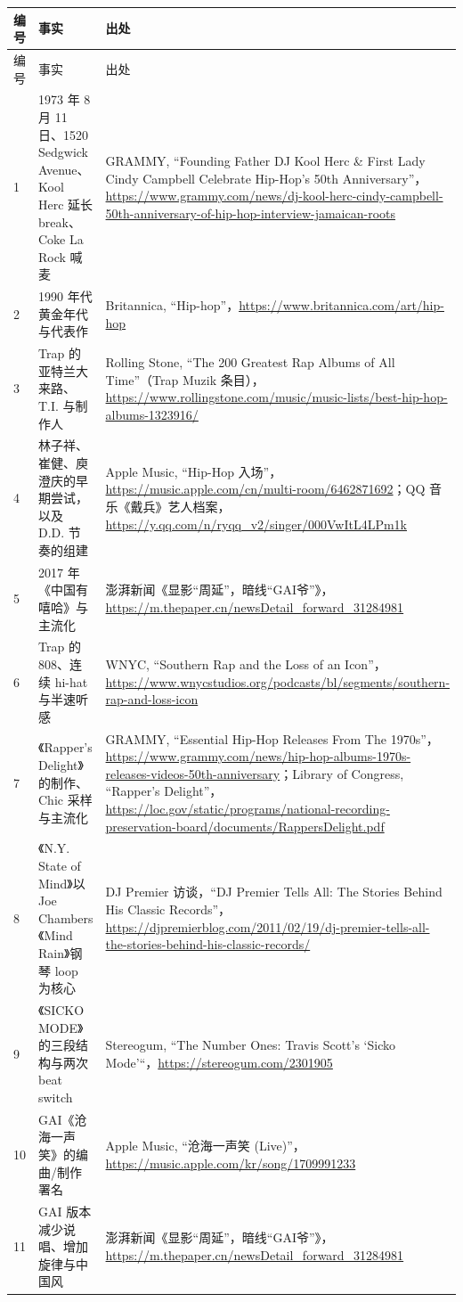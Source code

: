 \begin{longtable}{p{}p{}p{}}
\toprule
编号 & 事实 & 出处 \\
\midrule
\endfirsthead
\toprule
编号 & 事实 & 出处 \\
\midrule
\endhead
1 & 1973 年 8 月 11 日、1520 Sedgwick Avenue、Kool Herc 延长 break、Coke La Rock 喊麦 & GRAMMY, ``Founding Father DJ Kool Herc \& First Lady Cindy Campbell Celebrate Hip-Hop's 50th Anniversary''，\url{https://www.grammy.com/news/dj-kool-herc-cindy-campbell-50th-anniversary-of-hip-hop-interview-jamaican-roots} \\
2 & 1990 年代黄金年代与代表作 & Britannica, ``Hip-hop''，\url{https://www.britannica.com/art/hip-hop} \\
3 & Trap 的亚特兰大来路、T.I. 与制作人 & Rolling Stone, ``The 200 Greatest Rap Albums of All Time''（Trap Muzik 条目），\url{https://www.rollingstone.com/music/music-lists/best-hip-hop-albums-1323916/} \\
4 & 林子祥、崔健、庾澄庆的早期尝试，以及 D.D. 节奏的组建 & Apple Music, ``Hip-Hop 入场''，\url{https://music.apple.com/cn/multi-room/6462871692}；QQ 音乐《戴兵》艺人档案，\url{https://y.qq.com/n/ryqq_v2/singer/000VwItL4LPm1k} \\
5 & 2017 年《中国有嘻哈》与主流化 & 澎湃新闻《显影“周延”，暗线“GAI爷”》，\url{https://m.thepaper.cn/newsDetail_forward_31284981} \\
6 & Trap 的 808、连续 hi-hat 与半速听感 & WNYC, ``Southern Rap and the Loss of an Icon''，\url{https://www.wnycstudios.org/podcasts/bl/segments/southern-rap-and-loss-icon} \\
7 & 《Rapper's Delight》的制作、Chic 采样与主流化 & GRAMMY, ``Essential Hip-Hop Releases From The 1970s''，\url{https://www.grammy.com/news/hip-hop-albums-1970s-releases-videos-50th-anniversary}；Library of Congress, ``Rapper's Delight''，\url{https://loc.gov/static/programs/national-recording-preservation-board/documents/RappersDelight.pdf} \\
8 & 《N.Y. State of Mind》以 Joe Chambers《Mind Rain》钢琴 loop 为核心 & DJ Premier 访谈，``DJ Premier Tells All: The Stories Behind His Classic Records''，\url{https://djpremierblog.com/2011/02/19/dj-premier-tells-all-the-stories-behind-his-classic-records/} \\
9 & 《SICKO MODE》的三段结构与两次 beat switch & Stereogum, ``The Number Ones: Travis Scott's `Sicko Mode'``，\url{https://stereogum.com/2301905} \\
10 & GAI《沧海一声笑》的编曲/制作署名 & Apple Music, ``沧海一声笑 (Live)''，\url{https://music.apple.com/kr/song/1709991233} \\
11 & GAI 版本减少说唱、增加旋律与中国风 & 澎湃新闻《显影“周延”，暗线“GAI爷”》，\url{https://m.thepaper.cn/newsDetail_forward_31284981} \\
\bottomrule
\end{longtable}


